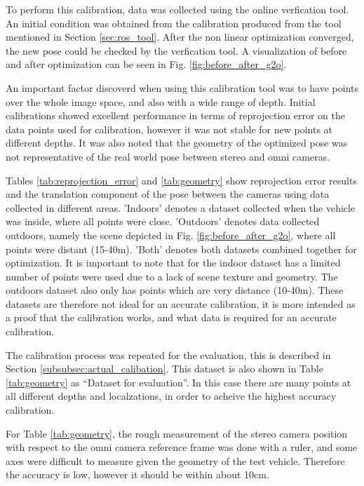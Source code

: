 To perform this calibration, data was collected using the online verfication tool.  An initial condition was obtained from the calibration produced from the tool mentioned in Section \ref{sec:ros_tool}.  After the non linear optimization converged, the new pose could be checked by the verfication tool.  A visualization of before and after optimization can be seen in Fig. \ref{fig:before_after_g2o}. 

An important factor discoverd when using this calibration tool was to have points over the whole image space, and also with a wide range of depth.  Initial calibrations showed excellent performance in terms of reprojection error on the data points used for calibration, however it was not stable for new points at different depths.  It was also noted that the geometry of the optimized pose was not representative of the real world pose between stereo and omni cameras.  

Tables \ref{tab:reprojection_error} and \ref{tab:geometry} show reprojection error results and the translation component of the pose between the cameras using data collected in different areas. 'Indoors' denotes a dataset collected when the vehicle was inside, where all points were close. 'Outdoors' denotes data collected outdoors, namely the scene depicted in Fig. \ref{fig:before_after_g2o}, where all points were distant (15-40m).  'Both' denotes both datasets combined together for optimization.  It is important to note that for the indoor dataset has a limited number of points were used due to a lack of scene texture and geometry.  The outdoors dataset also only has points which are very distance (10-40m).  These datasets are therefore not ideal for an accurate calibration, it is more intended as a proof that the calibration works, and what data is required for an accurate calibration.  

The calibration process was repeated for the evaluation, this is described in Section \ref{subsubsec:actual_calibation}.  This dataset is also shown in Table \ref{tab:geometry} as ``Dataset for evaluation''.  In this case there are many points at all different depths and localzations, in order to acheive the highest accuracy calibration.

For Table \ref{tab:geometry}, the rough measurement of the stereo camera position with respect to the omni camera reference frame was done with a ruler, and some axes were difficult to measure given the geometry of the test vehicle.  Therefore the accuracy is low, however it should be within about 10cm.

